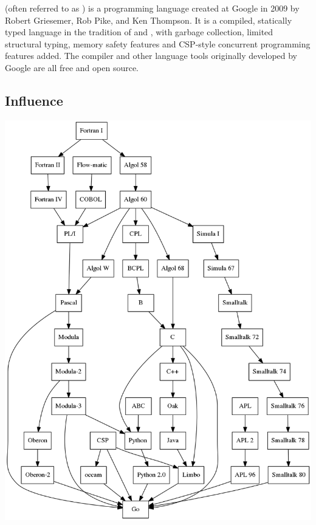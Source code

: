 \documentclass[../Languages.tex]{subfiles}
\begin{document}
\label{sec:g}

 (often referred to as ) is a programming language
created at Google in 2009 by Robert Griesemer, Rob Pike, and Ken Thompson. It
is a compiled, statically typed language in the tradition of
 and , with garbage collection, limited
structural typing, memory safety features and CSP-style concurrent programming
features added. The compiler and other language tools originally developed by
Google are all free and open source.

\subsection{Influence}\label{sub:influence}

\begin{Figure}
  \centering
  \includegraphics[height=0.5\textheight]{go}
\end{Figure}

\newpage
\end{document}
